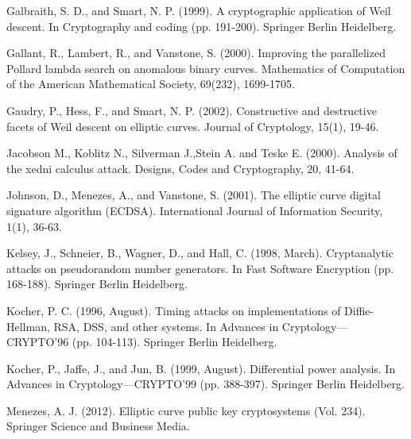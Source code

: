 \documentclass[11pt]{article}
\numberwithin{equation}{section} %
\numberwithin{figure}{section} %
\numberwithin{table}{section} %
\begin{document}
\begin{thebibliography}{99}
	Galbraith, S. D., and Smart, N. P. (1999). A cryptographic application of Weil descent. In Cryptography and coding (pp. 191-200). Springer Berlin Heidelberg.

	Gallant, R., Lambert, R., and Vanstone, S. (2000). Improving the parallelized Pollard lambda search on anomalous binary curves. Mathematics of Computation of the American Mathematical Society, 69(232), 1699-1705. 

	Gaudry, P., Hess, F., and Smart, N. P. (2002). Constructive and destructive facets of Weil descent on elliptic curves. Journal of Cryptology, 15(1), 19-46.

	Jacobson M., Koblitz N., Silverman J.,Stein A. and Teske E. (2000). Analysis of the xedni calculus
attack. Designs, Codes and Cryptography, 20, 41-64.

	 Johnson, D., Menezes, A., and Vanstone, S. (2001). The elliptic curve digital signature algorithm (ECDSA). International Journal of Information Security, 1(1), 36-63.

	Kelsey, J., Schneier, B., Wagner, D., and Hall, C. (1998, March). Cryptanalytic attacks on pseudorandom number generators. In Fast Software Encryption (pp. 168-188). Springer Berlin Heidelberg.

	Kocher, P. C. (1996, August). Timing attacks on implementations of Diffie-Hellman, RSA, DSS, and other systems. In Advances in Cryptology—CRYPTO’96 (pp. 104-113). Springer Berlin Heidelberg.

	Kocher, P., Jaffe, J., and Jun, B. (1999, August). Differential power analysis. In Advances in Cryptology—CRYPTO’99 (pp. 388-397). Springer Berlin Heidelberg.

	Menezes, A. J. (2012). Elliptic curve public key cryptosystems (Vol. 234). Springer Science and Business Media.


\end{thebibliography}
\end{document}

